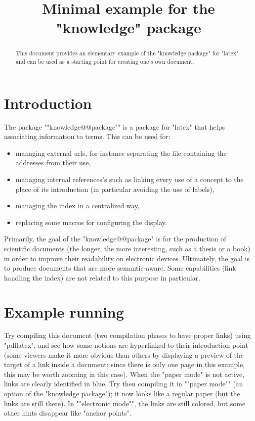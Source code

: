 \documentclass{article}
\title{Minimal example for the "knowledge" package}
\date{}
\author{}
\begin{document}
\maketitle


\begin{abstract}
  This document provides an elementary example of the "knowledge package" for "latex" and can be used as a starting point for creating one's own document.
\end{abstract}


\section{Introduction}
\label{section:introduction}

The package \AP""knowledge@@package"" is a package for "latex" that helps 
associating information to terms. This can be used for:
\begin{itemize}
	\item managing external urls, for instance separating the file containing  
    	the addresses from their use,
	\item managing internal references's such as linking every use of a concept 
    	to the place of its introduction (in particular avoiding the use of labels),
	\item managing the index in a centralized way,
	\item replacing some macros for configuring the display.
\end{itemize}

Primarily, the goal of the "knowledge@@package" is for the production of 
scientific documents (the longer, the more interesting, such as a thesis or a 
book) in order to improve their readability on electronic devices. Ultimately, 
the goal is to produce documents that are more semantic-aware. Some 
capabilities (link handling the index) are not related to this purpose in 
particular.

\section{Example running}
\label{section:example}

Try compiling this document (two compilation phases to have proper links) using 
"pdflatex", and see how some notions are hyperlinked to their introduction 
point (some viewers make it more obvious than others by displaying a preview of 
the target of a link inside a document; since there is only one page in this 
example, this may be worth zooming in this case).
When the "paper mode" is not active, links are clearly identified in blue. Try 
then compiling it in \AP""paper mode"" (an option of the "knowledge package"); 
it now looks like a regular paper (but the links are still there).
In \AP""electronic mode"", the links are still colored,
but some other hints disappear like "anchor points".
\end{document}
